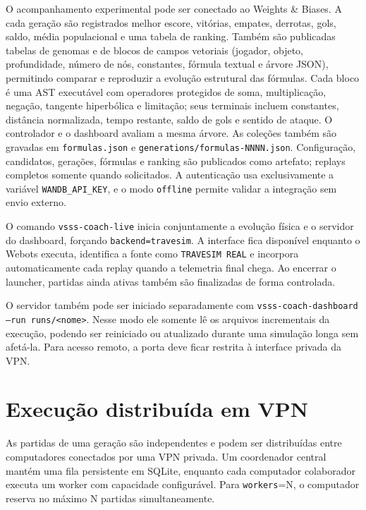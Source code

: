\documentclass[12pt,a4paper]{article}
\begin{document}
O acompanhamento experimental pode ser conectado ao Weights \& Biases. A cada gera\c{c}\~ao s\~ao registrados melhor escore, vit\'orias, empates, derrotas, gols, saldo, m\'edia populacional e uma tabela de ranking. Tamb\'em s\~ao publicadas tabelas de genomas e de blocos de campos vetoriais (jogador, objeto, profundidade, n\'umero de n\'os, constantes, f\'ormula textual e \'arvore JSON), permitindo comparar e reproduzir a evolu\c{c}\~ao estrutural das f\'ormulas. Cada bloco \'e uma AST execut\'avel com operadores protegidos de soma, multiplica\c{c}\~ao, nega\c{c}\~ao, tangente hiperb\'olica e limita\c{c}\~ao; seus terminais incluem constantes, dist\^ancia normalizada, tempo restante, saldo de gols e sentido de ataque. O controlador e o dashboard avaliam a mesma \'arvore. As cole\c{c}\~oes tamb\'em s\~ao gravadas em \texttt{formulas.json} e \texttt{generations/formulas-NNNN.json}. Configura\c{c}\~ao, candidatos, gera\c{c}\~oes, f\'ormulas e ranking s\~ao publicados como artefato; replays completos somente quando solicitados. A autentica\c{c}\~ao usa exclusivamente a vari\'avel \texttt{WANDB\_API\_KEY}, e o modo \texttt{offline} permite validar a integra\c{c}\~ao sem envio externo.

O comando \texttt{vsss-coach-live} inicia conjuntamente a evolu\c{c}\~ao f\'isica e o servidor do dashboard, for\c{c}ando \texttt{backend=travesim}. A interface fica dispon\'ivel enquanto o Webots executa, identifica a fonte como \texttt{TRAVESIM REAL} e incorpora automaticamente cada replay quando a telemetria final chega. Ao encerrar o launcher, partidas ainda ativas tamb\'em s\~ao finalizadas de forma controlada.

O servidor tamb\'em pode ser iniciado separadamente com \texttt{vsss-coach-dashboard --run runs/<nome>}. Nesse modo ele somente l\^e os arquivos incrementais da execu\c{c}\~ao, podendo ser reiniciado ou atualizado durante uma simula\c{c}\~ao longa sem afet\'a-la. Para acesso remoto, a porta deve ficar restrita \`a interface privada da VPN.

\section{Execu\c{c}\~ao distribu\'ida em VPN}

As partidas de uma gera\c{c}\~ao s\~ao independentes e podem ser distribu\'idas entre computadores conectados por uma VPN privada. Um coordenador central mant\'em uma fila persistente em SQLite, enquanto cada computador colaborador executa um worker com capacidade configur\'avel. Para \texttt{workers}=N, o computador reserva no m\'aximo N partidas simultaneamente.
\end{document}
